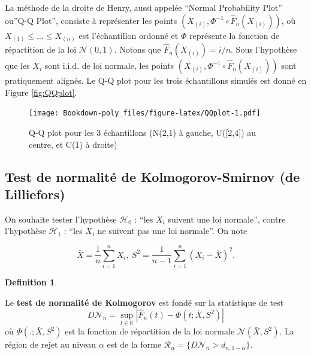 \documentclass[
]{book}
\theoremstyle{definition}
\newtheorem{definition}{Definition}[chapter]
\theoremstyle{definition}
\theoremstyle{definition}
\theoremstyle{definition}
\theoremstyle{remark}
\begin{document}
La méthode de la droite de Henry, aussi appelée ``Normal Probability Plot'' ou''Q-Q Plot'', consiste à représenter les points \((X_{(i)}, \Phi^{-1}\circ \hat{F}_n(X_{(i)}))\), où \(X_{(1)} \leq \ldots \leq X_{(n)}\) est l'échantillon ordonné et
\(\Phi\) représente la fonction de répartition de la loi \(\mathcal{N}(0,1)\). Notons que \(\hat F_n(X_{(i)})=i/n\).
Sous l'hypothèse que les \(X_i\) sont i.i.d. de loi normale, les points \((X_{(i)}, \Phi^{-1}\circ \hat F_n(X_{(i)}))\) sont pratiquement alignés. Le Q-Q plot pour les trois échantillons simulés est donné en Figure \ref{fig:QQplot}.

\begin{figure}
\centering
\texttt{[image: Bookdown-poly\_files/figure-latex/QQplot-1.pdf]}
\caption{\label{fig:QQplot}\label{QQplot} Q-Q plot pour les 3 échantillons (N(2,1) à gauche, U({[}2,4{]}) au centre, et C(1) à droite)}
\end{figure}

\hypertarget{test-de-normalituxe9-de-kolmogorov-smirnov-de-lilliefors}{%
\subsection{Test de normalité de Kolmogorov-Smirnov (de Lilliefors)}\label{test-de-normalituxe9-de-kolmogorov-smirnov-de-lilliefors}}

On souhaite tester l'hypothèse \(\mathcal{H}_0\) : ``les \(X_i\) suivent une loi normale'', contre l'hypothèse \(\mathcal{H}_1\) : ``les \(X_i\) ne suivent pas une loi normale''. On note

\[
\bar{X}=\frac1n \sum_{i=1}^n X_i, \ S^2=\frac1{n-1}  \sum_{i=1}^n (X_i-\bar{X})^2.
\]

\begin{definition}
\protect\hypertarget{def:unlabeled-div-38}{}\label{def:unlabeled-div-38}

Le \textbf{test de normalité de Kolmogorov} est fondé sur la statistique de test
\[ 
D\mathcal{N}_n=\sup_{t \in \mathbb{R}}| \hat F_n(t)-\Phi(t; \bar{X},S^2)|
\]
où \(\Phi(. ; \bar{X},S^2)\) est la fonction de répartition de la loi normale \(\mathcal{N}(\bar{X},S^2)\).
La région de rejet au niveau \(\alpha\) est de la forme \(\mathcal R_\alpha = \{ D\mathcal{N}_n > d_{n,1-\alpha}\}\).

\end{definition}
\end{document}
